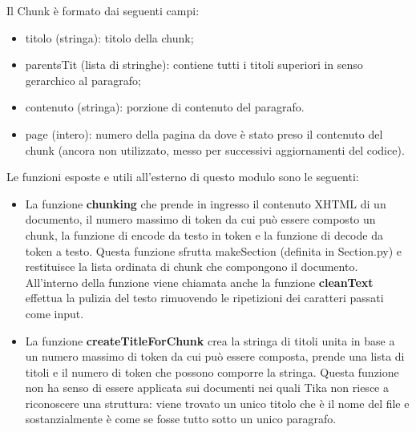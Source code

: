 Il Chunk è formato dai seguenti campi:
\begin{itemize}
    \item titolo (stringa): titolo della chunk;
    \item parentsTit (lista di stringhe): contiene tutti i titoli superiori in senso gerarchico al paragrafo;
    \item contenuto (stringa): porzione di contenuto del paragrafo.
    \item page (intero): numero della pagina da dove è stato preso il contenuto del chunk (ancora non utilizzato, messo per successivi aggiornamenti del codice). 
\end{itemize}

Le funzioni esposte e utili all'esterno di questo modulo sono le seguenti:
\begin{itemize}
    \item La funzione \textbf{chunking} che prende in ingresso il contenuto XHTML di un documento, il numero massimo di token da cui può essere composto un chunk, la funzione di encode da testo in token e la funzione di decode da token a testo.
    Questa funzione sfrutta makeSection (definita in Section.py) e restituisce la lista ordinata di chunk che compongono il documento.
    All'interno della funzione viene chiamata anche la funzione \textbf{cleanText} effettua la pulizia del testo rimuovendo le ripetizioni dei caratteri passati come input.
    \item La funzione \textbf{createTitleForChunk} crea la stringa di titoli unita in base a un numero massimo di token da cui può essere composta, prende una lista di titoli e il numero di token che possono comporre la stringa.
    Questa funzione non ha senso di essere applicata sui documenti nei quali Tika non riesce a riconoscere una struttura: viene trovato un unico titolo che è il nome del file e sostanzialmente è come se fosse tutto sotto un unico paragrafo.
\end{itemize}

